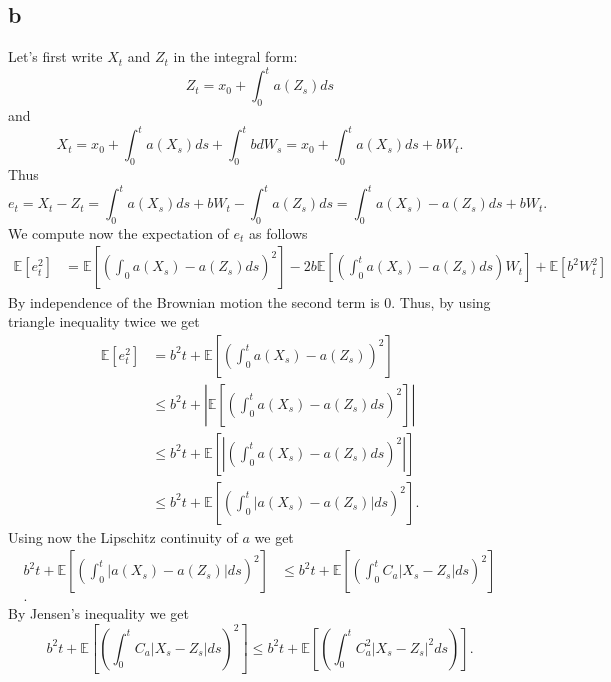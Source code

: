 \documentclass[a4paper,12pt]{article} %
\begin{document}
\subsection{b}
Let's first write \(X_t\) and \(Z_t\) in the integral form:
\begin{equation}
    Z_t = x_0 + \int_0^t a(Z_s)ds
\end{equation}
and
\begin{equation}
    X_t = x_0 + \int_0^t a(X_s)ds + \int_0^t b dW_s = x_0 + \int_0^t a(X_s)ds + bW_t.
\end{equation}
Thus
\begin{equation}
    e_t = X_t - Z_t = \int _0^t a(X_s)ds + bW_t - \int_0^t a(Z_s)ds = \int _0^t a(X_s)- a(Z_s)ds + bW_t.
\end{equation}
We compute now the expectation of \(e_t\) as follows
\begin{align}
    \mathbb{E} \left[ e_t^2 \right] & = \mathbb{E} \left[ \left( \int _0 a(X_s) - a(Z_s)ds \right)^{2}   \right] - 2b \mathbb{E} \left[ \left( \int _0^t  a(X_s) - a(Z_s)ds \right) W_t  \right] + \mathbb{E} \left[ b^{2} W_t^2  \right]
\end{align}
By independence of the Brownian motion the second term is 0.  Thus, by using triangle inequality twice we get
\begin{align*}
    \mathbb{E} \left[ e_t^2 \right] & =  b^2 t + \mathbb{E} \left[ \left( \int _0^t a(X_s) - a(Z_s) \right) ^{2}  \right]                      \\
                                    & \leq b^2 t + \left| \mathbb{E} \left[ \left( \int _0^t a(X_s) - a(Z_s) ds\right)^{2}   \right]\right|    \\
                                    & \leq  b^2 t + \mathbb{E} \left[ \left| \left( \int _0^t a(X_s) - a(Z_s)ds \right)^{2} \right|  \right]   \\
                                    & \leq  b^2 t + \mathbb{E} \left[  \left( \int _0^t \left|a(X_s) - a(Z_s)\right| ds \right) ^{2} \right] .
\end{align*}
Using now the Lipschitz continuity of \(a\) we get
\begin{align*}
    b^2 t + \mathbb{E} \left[  \left( \int _0^t \left|a(X_s) - a(Z_s)\right| ds \right) ^{2} \right] & \leq  b^2 t+ \mathbb{E} \left[  \left( \int _0^t C_a \left|X_s - Z_s\right| ds \right)^{2}  \right] \\.
\end{align*}
By Jensen's inequality we get
\begin{equation}
    b^2t+ \mathbb{E} \left[  \left( \int _0^t C_a \left|X_s - Z_s\right| ds \right)^{2}  \right]  \leq b^2 t+ \mathbb{E} \left[  \left( \int _0^t C_{a} ^{2}  \left|X_s - Z_s\right|^{2}  ds \right)  \right].
\end{equation}
\end{document}
